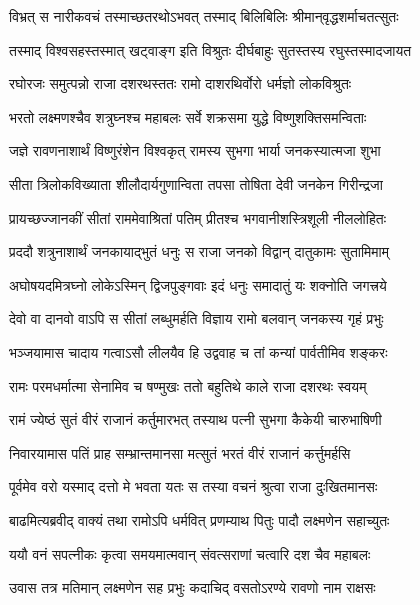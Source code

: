 \twolineshloka
{विभ्रत् स नारीकवचं तस्माच्छतरथोऽभवत्}
{तस्माद् बिलिबिलिः श्रीमान्‌वृद्धशर्माचतत्सुतः} %

\twolineshloka
{तस्माद् विश्वसहस्तस्मात् खट्वाङ्ग इति विश्रुतः}
{दीर्घबाहुः सुतस्तस्य रघुस्तस्मादजायत} %

\twolineshloka
{रघोरजः समुत्पन्नो राजा दशरथस्ततः}
{रामो दाशरथिर्वोरो धर्मज्ञो लोकविश्रुतः} %

\twolineshloka
{भरतो लक्ष्मणश्चैव शत्रुघ्नश्च महाबलः}
{सर्वे शक्रसमा युद्धे विष्णुशक्तिसमन्विताः} %

\twolineshloka
{जज्ञे रावणनाशार्थं विष्णुरंशेन विश्वकृत्}
{रामस्य सुभगा भार्या जनकस्यात्मजा शुभा} %

\twolineshloka
{सीता त्रिलोकविख्याता शीलौदार्यगुणान्विता}
{तपसा तोषिता देवी जनकेन गिरीन्द्रजा} %

\twolineshloka
{प्रायच्छज्जानकीं सीतां राममेवाश्रितां पतिम्}
{प्रीतश्च भगवानीशस्त्रिशूली नीललोहितः} %

\twolineshloka
{प्रददौ शत्रुनाशार्थं जनकायाद्‌भुतं धनुः}
{स राजा जनको विद्वान् दातुकामः सुतामिमाम्} %

\twolineshloka
{अघोषयदमित्रघ्नो लोकेऽस्मिन् द्विजपुङ्गवाः}
{इदं धनुः समादातुं यः शक्नोति जगत्त्रये} %

\twolineshloka
{देवो वा दानवो वाऽपि स सीतां लब्धुमर्हति}
{विज्ञाय रामो बलवान् जनकस्य गृहं प्रभुः} %

\twolineshloka
{भञ्जयामास चादाय गत्वाऽसौ लीलयैव हि}
{उद्ववाह च तां कन्यां पार्वतीमिव शङ्करः} %

\twolineshloka
{रामः परमधर्मात्मा सेनामिव च षण्मुखः}
{ततो बहुतिथे काले राजा दशरथः स्वयम्} %

\twolineshloka
{रामं ज्येष्ठं सुतं वीरं राजानं कर्तुमारभत्}
{तस्याथ पत्नी सुभगा कैकेयी चारुभाषिणी} %

\twolineshloka
{निवारयामास पतिं प्राह सम्भ्रान्तमानसा}
{मत्सुतं भरतं वीरं राजानं कर्त्तुमर्हसि} %

\twolineshloka
{पूर्वमेव वरो यस्माद् दत्तो मे भवता यतः}
{स तस्या वचनं श्रुत्वा राजा दुःखितमानसः} %

\twolineshloka
{बाढमित्यब्रवीद्  वाक्यं तथा रामोऽपि धर्मवित्}
{प्रणम्याथ पितुः पादौ लक्ष्मणेन सहाच्युतः} %

\twolineshloka
{ययौ वनं सपत्नीकः कृत्वा समयमात्मवान्}
{संवत्सराणां चत्वारि दश चैव महाबलः} %

\twolineshloka
{उवास तत्र मतिमान् लक्ष्मणेन सह प्रभुः}
{कदाचिद् वसतोऽरण्ये रावणो नाम राक्षसः} %

